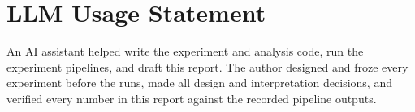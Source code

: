 \documentclass[11pt]{article}
\begin{document}
\section*{LLM Usage Statement}

An AI assistant helped write the experiment and analysis code, run the
experiment pipelines, and draft this report. The author designed and froze
every experiment before the runs, made all design and interpretation
decisions, and verified every number in this report against the recorded
pipeline outputs.
\end{document}

